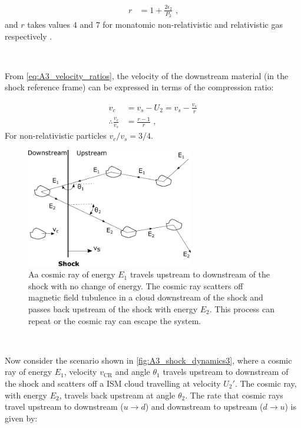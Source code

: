 \begin{equation}
    \begin{aligned}
        r&=1+\frac{2\epsilon_2}{P_2}\text{ ,}
    \end{aligned}
\end{equation}
\noindent and $r$ takes values $4$ and $7$ for monatomic non-relativistic and relativistic gas respectively  \citep{1983RPPh...46..973D}.
\par~\par 
From \autoref{eq:A3_velocity_ratios}, the velocity of the downstream material (in the shock reference frame) can be expressed in terms of the compression ratio:

\begin{equation}
    \begin{aligned}
        v_c &=v_s-U_2=v_s-\frac{v_s}{r} \\
        \therefore \frac{v_c}{v_s}&=\frac{r-1}{r}\text{ ,}
    \end{aligned} \label{eq:down_upstream_v_ratio}
\end{equation}
\noindent For non-relativistic particles ${v_c}/{v_s}=3/4$.
\begin{figure}
	\centering
	\includegraphics[width=0.65\textwidth]{A3_Diffusive_Shock_Acceleration/Images/dsa.pdf}
	\caption{Aa cosmic ray of energy $E_1$ travels upstream to downstream of the shock with no change of energy. The cosmic ray scatters off magnetic field tubulence in a cloud downstream of the shock and passes back upstream of the shock with energy $E_2$. This process can repeat or the cosmic ray can escape the system.}
	\label{fig:A3_shock_dynamics3}
\end{figure}
\par~\par 
Now consider the scenario shown in \autoref{fig:A3_shock_dynamics3}, where a cosmic ray of energy $E_1$, velocity $v_\text{CR}$ and angle $\theta_1$ travels upstream to downstream of the shock and scatters off a ISM cloud travelling at velocity $U_2'$. The cosmic ray, with energy $E_2$, travels back upstream at angle $\theta_2$. The rate that cosmic rays travel upstream to downstream ($u\rightarrow d$) and downstream to upstream ($d\rightarrow u$) is given by:


